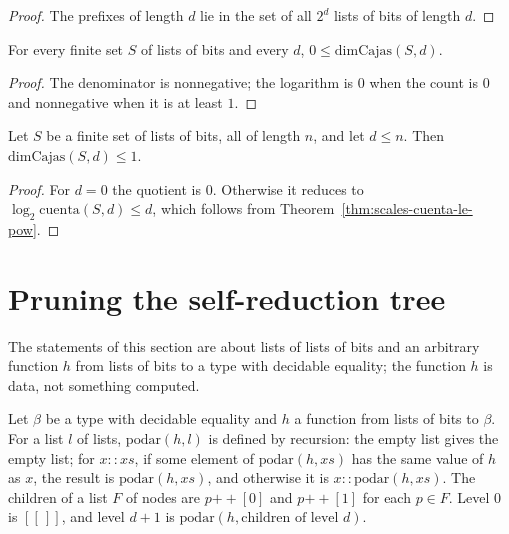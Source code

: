 \begin{proof}
  \leanok
  The prefixes of length $d$ lie in the set of all $2^d$ lists of bits of length $d$.
\end{proof}

\begin{proposition}
  \label{prop:scales-dimcajas-nonneg}
  \leanok
  For every finite set $S$ of lists of bits and every $d$, $0 \le \mathrm{dimCajas}(S,d)$.
  \own{}
\end{proposition}

\begin{proof}
  \leanok
  The denominator is nonnegative; the logarithm is $0$ when the count is $0$ and nonnegative when it is at
  least $1$.
\end{proof}

\begin{proposition}
  \label{prop:scales-dimcajas-le-uno}
  \leanok
  Let $S$ be a finite set of lists of bits, all of length $n$, and let $d \le n$. Then
  $\mathrm{dimCajas}(S,d) \le 1$.
  \own{}
\end{proposition}

\begin{proof}
  \leanok
  For $d = 0$ the quotient is $0$. Otherwise it reduces to $\log_2 \mathrm{cuenta}(S,d) \le d$, which
  follows from Theorem~\ref{thm:scales-cuenta-le-pow}.
\end{proof}

\section{Pruning the self-reduction tree}
\label{sec:scales-poda}

The statements of this section are about lists of lists of bits and an arbitrary function $h$ from lists
of bits to a type with decidable equality; the function $h$ is data, not something computed.

\begin{definition}
  \label{def:scales-poda}
  \leanok
  Let $\beta$ be a type with decidable equality and $h$ a function from lists of bits to $\beta$. For a
  list $l$ of lists, $\mathrm{podar}(h,l)$ is defined by recursion: the empty list gives the empty list;
  for $x :: xs$, if some element of $\mathrm{podar}(h,xs)$ has the same value of $h$ as $x$, the result is
  $\mathrm{podar}(h,xs)$, and otherwise it is $x :: \mathrm{podar}(h,xs)$. The children of a list $F$ of
  nodes are $p \mathbin{+\!\!+} [0]$ and $p \mathbin{+\!\!+} [1]$ for each $p \in F$. Level $0$ is
  $[[\,]]$, and level $d+1$ is $\mathrm{podar}(h, \text{children of level } d)$.
  \own{}
\end{definition}

